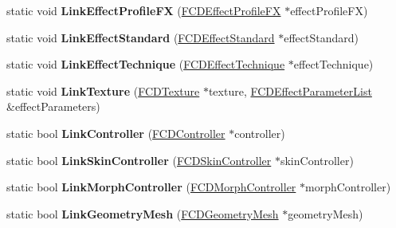 \begin{DoxyCompactItemize}
\item 
\hypertarget{classFArchiveXML_a5cd590dc516bb8685a91f3178995a549}{
static void {\bfseries LinkEffectProfileFX} (\hyperlink{classFCDEffectProfileFX}{FCDEffectProfileFX} $\ast$effectProfileFX)}
\label{classFArchiveXML_a5cd590dc516bb8685a91f3178995a549}

\item 
\hypertarget{classFArchiveXML_abfe6cf3544b64877e0860a129aa241c2}{
static void {\bfseries LinkEffectStandard} (\hyperlink{classFCDEffectStandard}{FCDEffectStandard} $\ast$effectStandard)}
\label{classFArchiveXML_abfe6cf3544b64877e0860a129aa241c2}

\item 
\hypertarget{classFArchiveXML_a6dc44608a425b4f5ba4c2e7f630e115d}{
static void {\bfseries LinkEffectTechnique} (\hyperlink{classFCDEffectTechnique}{FCDEffectTechnique} $\ast$effectTechnique)}
\label{classFArchiveXML_a6dc44608a425b4f5ba4c2e7f630e115d}

\item 
\hypertarget{classFArchiveXML_a2f06bd7040ce72f22da8b20de08083bc}{
static void {\bfseries LinkTexture} (\hyperlink{classFCDTexture}{FCDTexture} $\ast$texture, \hyperlink{classfm_1_1pvector}{FCDEffectParameterList} \&effectParameters)}
\label{classFArchiveXML_a2f06bd7040ce72f22da8b20de08083bc}

\item 
\hypertarget{classFArchiveXML_a5fee7c3ab0e0952e722c92a02cc96363}{
static bool {\bfseries LinkController} (\hyperlink{classFCDController}{FCDController} $\ast$controller)}
\label{classFArchiveXML_a5fee7c3ab0e0952e722c92a02cc96363}

\item 
\hypertarget{classFArchiveXML_a2a33aca1e78c523f54ca69efa136e08a}{
static bool {\bfseries LinkSkinController} (\hyperlink{classFCDSkinController}{FCDSkinController} $\ast$skinController)}
\label{classFArchiveXML_a2a33aca1e78c523f54ca69efa136e08a}

\item 
\hypertarget{classFArchiveXML_a79eb4da1ff65e11e1f0b56f2f9f5ed2f}{
static bool {\bfseries LinkMorphController} (\hyperlink{classFCDMorphController}{FCDMorphController} $\ast$morphController)}
\label{classFArchiveXML_a79eb4da1ff65e11e1f0b56f2f9f5ed2f}

\item 
\hypertarget{classFArchiveXML_a888d8c4cf531152d2f919bfdc67a4bc7}{
static bool {\bfseries LinkGeometryMesh} (\hyperlink{classFCDGeometryMesh}{FCDGeometryMesh} $\ast$geometryMesh)}
\label{classFArchiveXML_a888d8c4cf531152d2f919bfdc67a4bc7}


\end{DoxyCompactItemize}
